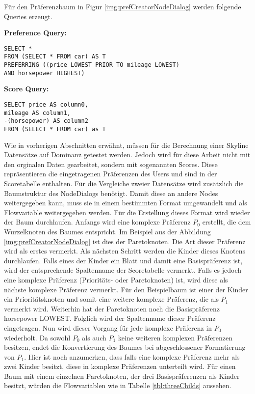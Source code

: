 Für den Präferenzbaum in Figur \ref{img:prefCreatorNodeDialog} werden folgende Queries erzeugt.

\textbf{Preference Query:}
\begin{verbatim}
SELECT * 
FROM (SELECT * FROM car) AS T 
PREFERRING ((price LOWEST PRIOR TO mileage LOWEST) 
AND horsepower HIGHEST)
\end{verbatim}

\textbf{Score Query:}
\begin{verbatim}
SELECT price AS column0,
mileage AS column1,
-(horsepower) AS column2 
FROM (SELECT * FROM car) as T
\end{verbatim}

Wie in vorherigen Abschnitten erwähnt, müssen für die Berechnung einer Skyline Datensätze auf Dominanz getestet werden. Jedoch wird für diese Arbeit nicht mit den orginalen Daten gearbeitet, sondern mit sogenannten Scores. Diese repräsentieren die eingetragenen Präferenzen des Users und sind in der Scoretabelle enthalten. Für die Vergleiche zweier Datensätze wird zusätzlich die Baumstruktur des NodeDialogs benötigt. Damit diese an andere Nodes weitergegeben kann, muss sie in einem bestimmten Format umgewandelt und als Flowvariable weitergegeben werden. 
Für die Erstellung dieses Format wird wieder der Baum durchlaufen. Anfangs wird eine komplexe Präferenz $P_0$ erstellt, die dem Wurzelknoten des Baumes entspricht. Im Beispiel aus der Abbildung \ref{img:prefCreatorNodeDialog} ist dies der Paretoknoten. Die Art dieser Präferenz wird als erstes vermerkt. Als nächsten Schritt werden die Kinder dieses Knotens durchlaufen. Falls eines der Kinder ein Blatt und damit eine Basispräferenz ist, wird der entsprechende Spaltenname der Scoretabelle vermerkt. Falls es jedoch eine komplexe Präferenz (Prioritäts- oder Paretoknoten) ist, wird diese als nächste komplexe Präferenz vermerkt. Für den Beispielbaum ist einer der Kinder ein Prioritätsknoten und somit eine weitere komplexe Präferenz, die als $P_1$ vermerkt wird. Weiterhin hat der Paretoknoten noch die Basispräferenz horsepower LOWEST. Folglich wird der Spaltenname dieser Präferenz eingetragen. Nun wird dieser Vorgang für jede komplexe Präferenz in $P_0$ wiederholt. Da sowohl $P_0$ als auch $P_1$ keine weiteren komplexen Präferenzen besitzen, endet die Konvertierung des Baumes bei abgeschlossener Formatierung von $P_1$.
Hier ist noch anzumerken, dass falls eine komplexe Präferenz mehr als zwei Kinder besitzt, diese in komplexe Präferenzen unterteilt wird. Für einen Baum mit einem einzelnen Paretoknoten, der drei Basispräferenzen als Kinder besitzt, würden die Flowvariablen wie in Tabelle \ref{tbl:threeChilds} aussehen.

